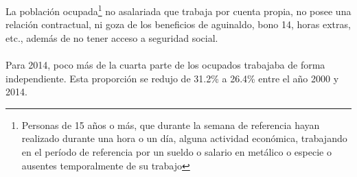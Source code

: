 La población ocupada\footnote{Personas de 15 años o más, que durante la semana de referencia hayan realizado durante una hora o un día, alguna actividad económica, trabajando en el período de referencia por un sueldo o salario en metálico o especie o ausentes temporalmente de su trabajo} no asalariada que trabaja por cuenta propia, no posee una relación contractual, ni goza de los beneficios de aguinaldo, bono 14, horas extras, etc., además de no tener acceso a seguridad social.\\\\
 Para 2014, poco más de la cuarta parte de los ocupados trabajaba de forma independiente. Esta proporción se redujo de 31.2\% a 26.4\% entre  el año 2000 y  2014.